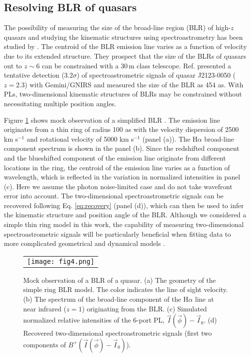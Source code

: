 \documentclass[]{AO4ELT}  %
\begin{document}
\subsection{Resolving BLR of quasars}\label{ssec:quasar}

The possibility of measuring the size of the broad-line region (BLR) of high-$z$ quasars and studying the kinematic structures using spectroastrometry has been studied by \cite{ste15}. The centroid of the BLR emission line varies as a function of velocity due to its extended structure. They prospect that the size of the BLRs of quasars out to $z\sim 6$ can be constrained with a 30\,m class telescope. 
Ref. \cite{bos21} presented a tentative detection (3.2$\sigma$) of spectroastrometric signals of quasar J2123-0050 ($z=2.3$) with Gemini/GNIRS and measured the size of the BLR as 454 \textmu as. 
With PLs, two-dimensional kinematic structures of BLRs may be constrained without necessitating multiple position angles. 


Figure \ref{fig:blr} shows mock observation of a simplified BLR \cite{ste15}. The emission line originates from a thin ring of radius 100 \textmu as with the velocity dispersion of 2500 km s$^{-1}$ and rotational velocity of 5000 km s$^{-1}$ (panel (a)). The H$\alpha$ broad-line component spectrum is shown in the panel (b). Since the redshifted component and the blueshifted component of the emission line originate from different locations in the ring, the centroid of the emission line varies as a function of wavelength, which is reflected in the variation in normalized intensities in panel (c). Here we assume the photon noise-limited case and do not take wavefront error into account. The two-dimensional spectroastrometric signals can be recovered following Eq. \ref{eq:recovery} (panel (d)), which can then be used to infer the kinematic structure and position angle of the BLR. Although we considered a simple thin ring model in this work, the capability of measuring two-dimensional spectroastrometric signals will be particularly beneficial when fitting data to more complicated geometrical and dynamical models \cite{pan11, pan14}.


\begin{figure} [hbt!]
\begin{center}
\begin{tabular}{c} 
\texttt{[image: fig4.png]}
\end{tabular}
\end{center}
\caption[example] 
{ \label{fig:blr} 
Mock observation of a BLR of a quasar. (a) The geometry of the simple ring BLR model. The color indicates the line of sight velocity. (b) The spectrum of the broad-line component of the H$\alpha$ line at near infrared ($z=1$) originating from the BLR. (c) Simulated normalized relative intensities of the 6-port PL, $\vec{I}(\vec{\phi}) - \vec{I}_0$. (d) Recovered two-dimensional spectroastrometric signals (first two components of $B^{+} (\vec{I}(\vec{\phi}) - \vec{I}_0)$).}
\end{figure} 
\end{document}
